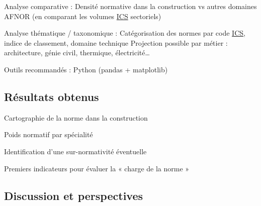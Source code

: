 \documentclass[a4paper,12pt]{article}
\begin{document}
Analyse comparative :
    Densité normative dans la construction vs autres domaines AFNOR (en comparant les volumes \protect\hyperlink{gls-10}{\label{gls-10-use-2}ICS} sectoriels)

Analyse thématique / taxonomique :
    Catégorisation des normes par code \protect\hyperlink{gls-10}{\label{gls-10-use-3}ICS}, indice de classement, domaine technique
    Projection possible par métier : architecture, génie civil, thermique, électricité…

Outils recommandés : Python (pandas + matplotlib)
\subsection{Résultats obtenus}
\label{sec:org7df4a8b}
Cartographie de la norme dans la construction

Poids normatif par spécialité

Identification d’une sur-normativité éventuelle

Premiers indicateurs pour évaluer la « charge de la norme »
\subsection{Discussion et perspectives}
\label{sec:orgdfff58a}
\clearpage
\end{document}
